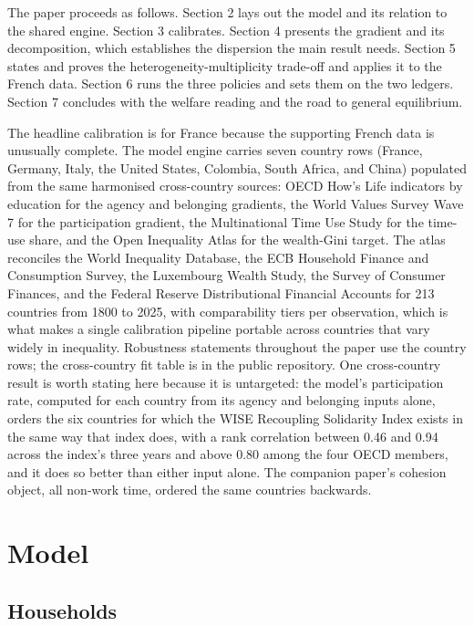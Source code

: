\documentclass[11pt]{article}
\begin{document}
The paper proceeds as follows. Section 2 lays out the model and its relation to the shared engine. Section 3 calibrates. Section 4 presents the gradient and its decomposition, which establishes the dispersion the main result needs. Section 5 states and proves the heterogeneity-multiplicity trade-off and applies it to the French data. Section 6 runs the three policies and sets them on the two ledgers. Section 7 concludes with the welfare reading and the road to general equilibrium.

The headline calibration is for France because the supporting French data is unusually complete. The model engine carries seven country rows (France, Germany, Italy, the United States, Colombia, South Africa, and China) populated from the same harmonised cross-country sources: OECD How's Life indicators by education for the agency and belonging gradients, the World Values Survey Wave 7 for the participation gradient, the Multinational Time Use Study for the time-use share, and the Open Inequality Atlas \citep{conway2025atlas} for the wealth-Gini target. The atlas reconciles the World Inequality Database, the ECB Household Finance and Consumption Survey, the Luxembourg Wealth Study, the Survey of Consumer Finances, and the Federal Reserve Distributional Financial Accounts for 213 countries from 1800 to 2025, with comparability tiers per observation, which is what makes a single calibration pipeline portable across countries that vary widely in inequality. Robustness statements throughout the paper use the country rows; the cross-country fit table is in the public repository. One cross-country result is worth stating here because it is untargeted: the model's participation rate, computed for each country from its agency and belonging inputs alone, orders the six countries for which the WISE Recoupling Solidarity Index exists in the same way that index does, with a rank correlation between 0.46 and 0.94 across the index's three years and above 0.80 among the four OECD members, and it does so better than either input alone. The companion paper's cohesion object, all non-work time, ordered the same countries backwards.

\section{Model}

\subsection{Households}
\end{document}
